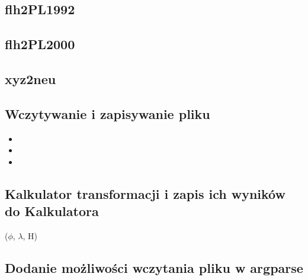 \documentclass[10pt,a4paper]{article}
\begin{document}
	\subsection{flh2PL1992} 

	\subsection{flh2PL2000} 

	
	\subsection{xyz2neu} 
	
	\newpage
	\subsection{Wczytywanie i zapisywanie pliku}

	\begin{itemize}
		\item 
		\item 
		\item 
	\end{itemize}

	\subsection{Kalkulator transformacji i zapis ich wyników do Kalkulatora}

	($\phi$, $\lambda$, H) 

	
	\subsection{Dodanie możliwości wczytania pliku w argparse}

	

		
\end{document}
